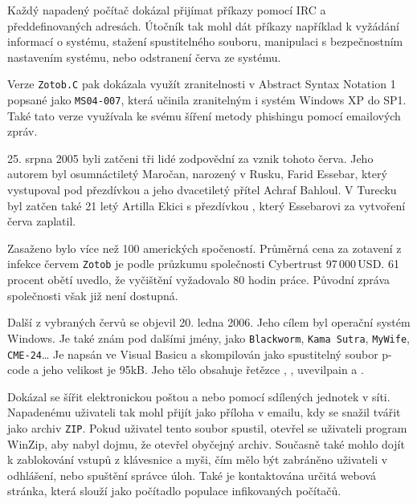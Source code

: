 \documentclass[a4paper,12pt]{article}
\begin{document}
Každý napadený počítač dokázal přijímat příkazy pomocí IRC a předdefinovaných adresách. Útočník tak mohl dát příkazy například k vyžádání informací o systému, stažení spustitelného souboru, manipulaci s bezpečnostním nastavením systému, nebo odstranení červa ze systému.

Verze \texttt{Zotob.C} pak dokázala využít zranitelnosti v Abstract Syntax Notation 1 popsané jako \texttt{MS04-007}, která učinila zranitelným i systém Windows XP do SP1\cite{zotob-msbulletin2}. Také tato verze využívala ke svému šíření metody phishingu pomocí emailových zpráv.\cite{zotobc-fsecure}

25. srpna 2005 byli zatčeni tři lidé zodpovědní za vznik tohoto červa. Jeho autorem byl osumnáctiletý Maročan, narozený v Rusku, Farid Essebar, který vystupoval pod přezdívkou  a jeho dvacetiletý přítel Achraf Bahloul. V Turecku byl zatčen také 21 letý Artilla Ekici s přezdívkou , který Essebarovi za vytvoření červa zaplatil.\cite{zotob-schneider}\cite{zotob-fbi}

Zasaženo bylo více než 100 amerických spočeností\cite{zotob-fbi}. Průměrná cena za zotavení z infekce červem \texttt{Zotob} je podle průzkumu společnosti Cybertrust 97\,000\,USD. 61 procent obětí uvedlo, že vyčištění vyžadovalo 80 hodin práce.\cite{zotob-wikidot}\cite{zotob-cnet} Původní zpráva společnosti však již není dostupná.

Další z vybraných červů se objevil 20. ledna 2006\cite{nyxem-wiki}. Jeho cílem byl operační systém Windows. Je také znám pod dalšími jmény, jako \texttt{Blackworm}, \texttt{Kama Sutra}, \texttt{MyWife}, \texttt{CME-24}\dots\cite{nyxem-caida} Je napsán ve Visual Basicu a skompilován jako spustitelný soubor p-code a jeho velikost je 95kB. Jeho tělo obsahuje řetězce , , uv{evilpain} a .\cite{nyxem-fsecure} 

Dokázal se šířit elektronickou poštou a nebo pomocí sdílených jednotek v síti. Napadenému uživateli tak mohl přijít jako příloha v emailu, kdy se snažil tvářit jako archiv \texttt{ZIP}. Pokud uživatel tento soubor spustil, otevřel se uživateli program WinZip, aby nabyl dojmu, že otevřel obyčejný archiv\cite{nyxem-trendmicro}. Současně také mohlo dojít k zablokování vstupů z klávesnice a myši, čím mělo být zabráněno uživateli v odhlášení, nebo spuštění správce úloh\cite{nyxem-fsecure}\cite{nyxem-trendmicro}. Také je kontaktována určitá webová stránka, která slouží jako počítadlo populace infikovaných počítačů.
\end{document}
